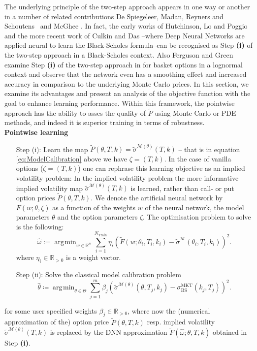 \documentclass{article}
\theoremstyle{remark}
\DeclareMathOperator*{\argmin}{\arg\!\min}
\begin{document}
The underlying principle of the two-step approach appears in one way or another in a number of related contributions 
De Spiegeleer, Madan, Reyners and Schoutens~\cite{MadanSchoutens} and McGhee \cite{McGhee}. In fact, the early works of Hutchinson, Lo and Poggio \cite{Hutchison94} and the more recent work of Culkin and Das \cite{CulcinDas17}--where Deep Neural Networks are applied neural to learn the Black-Scholes formula--can be recognised as Step \textbf{(i)} of the two-step approach in a Black-Scholes context.
Also Ferguson and Green \cite{FG18} examine Step \textbf{(i)} of the two-step approach in \cite{FG18} for basket options in a lognormal context and observe that the network even has a smoothing effect and increased accuracy in comparison to the underlying Monte Carlo prices. In this section, we examine its advantages and present an analysis of the objective function with the goal to enhance learning performance. Within this framework, the pointwise approach has the ability to asses the quality of $\widetilde{P}$ using Monte Carlo or PDE methods, and indeed it is superior training in terms of robustness.
\vspace*{0.5cm}\\ 
\textbf{Pointwise learning}\\

\begin{enumerate}
\item[Step (i):] Learn the map
  $\widetilde{P}(\theta,T,k)=\widetilde{\sigma}^{\mathcal{M}(\theta)}(T,k)$ -- that is in equation \eqref{eq:ModelCalibration} above we have $\zeta = (T,k)$. In the case of vanilla options ($\zeta = (T,k)$) one can rephrase this learning objective as an implied volatility problem:
 In the implied volatility problem the more informative implied volatility map $\widetilde{\sigma}^{\mathcal{M}(\theta)}(T,k)$  is learned, rather than call- or put option prices $\widetilde{P}(\theta,T,k)$. We denote the
  artificial neural network by $F(w;\theta, \zeta)$ as a function of the
  weights $w$ of the neural network, the model parameters $\theta$ and the
  option parameters $\zeta$. The optimisation problem to solve is the
  following:
  \begin{equation}
    \label{eq:general_loss}
    \widehat{\omega}:= \argmin_{w\in\mathbb{R}^n}\sum_{i=1}^{N_{\mathrm{Train}}}
    \eta_i(\widetilde{F}(w;\theta_{i},T_i,k_i)-\widetilde{\sigma}^{\mathcal{M}}(\theta_{i},T_i,k_i))^2. 
  \end{equation}
  where $\eta_i\in\mathbb{R}_{>0}$ is a weight vector.
\item[Step (ii):] Solve the classical model calibration problem 
$$\widehat{\theta} \coloneqq \argmin_{\theta\in\Theta}
  \sum_{j=1}^{m} \beta_j(\widetilde{\sigma}^{\mathcal{M}(\theta)}(\theta,T_j,k_j)-\sigma^{\mathrm{MKT}}_{\mathrm{BS}}(k_j,T_j))^2.$$
\end{enumerate}
for some user specified weights $\beta_j\in\mathbb{R}_{>0}$, where now the (numerical approximation of the) option price $\widetilde{P}(\theta,T,k)$  resp. implied volatility $\widetilde{\sigma}^{\mathcal{M}(\theta)}(T,k)$ is replaced by the DNN approximation $\widetilde{F}(\widehat{\omega}; \theta, T, k)$ obtained in Step \textbf{(i)}.
\end{document}
